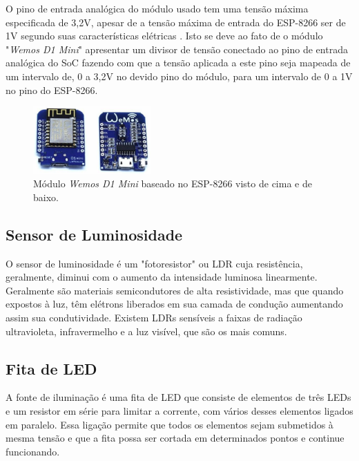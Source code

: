 O pino de entrada analógica do módulo usado tem uma tensão máxima especificada de 3,2V, apesar de a tensão máxima de entrada do ESP-8266 ser de 1V segundo suas características elétricas \cite{esp}. Isto se deve ao fato de o módulo "\textit{Wemos D1 Mini}" apresentar um divisor de tensão conectado ao pino de entrada analógica do SoC fazendo com que a tensão aplicada a este pino seja mapeada de um intervalo de, 0 a 3,2V no devido pino do módulo, para um intervalo de 0 a 1V no pino do ESP-8266.

\begin{figure}[ht]
    \begin{center}
    \includegraphics[width=0.4\textwidth]{figuras/wemos.PNG}
    \end{center}
    \caption[Ilustração do módulo \textit{Wemos D1 Mini}.]{Módulo \textit{Wemos D1 Mini} baseado no ESP-8266 visto de cima e de baixo.}
    \label{wemos}
\end{figure}

\subsection{Sensor de Luminosidade}

O sensor de luminosidade %
é um "fotoresistor" ou \acf{LDR} cuja resistência, geralmente, diminui com o aumento da intensidade luminosa linearmente. Geralmente são materiais semicondutores de alta resistividade, mas que quando expostos à luz, têm elétrons liberados em sua camada de condução aumentando assim sua condutividade. Existem LDRs sensíveis a faixas de radiação ultravioleta, infravermelho e a luz visível, que são os mais comuns.



\subsection{Fita de LED}
A fonte de iluminação é uma fita de LED que consiste de elementos de três LEDs e um resistor em série para limitar a corrente, com vários desses elementos ligados em paralelo. Essa ligação permite que todos os elementos sejam submetidos à mesma tensão e que a fita possa ser cortada em determinados pontos e continue funcionando.


